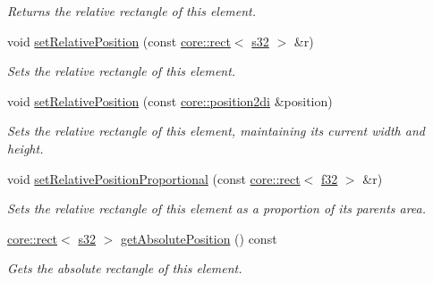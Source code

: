 \begin{DoxyCompactItemize}
\begin{DoxyCompactList}\small\item\em Returns the relative rectangle of this element. \end{DoxyCompactList}\item 
void \hyperlink{classirr_1_1gui_1_1IGUIElement_a0e5bb2d0a2e88e30d3697652f8dd7034}{set\+Relative\+Position} (const \hyperlink{classirr_1_1core_1_1rect}{core\+::rect}$<$ \hyperlink{namespaceirr_ac66849b7a6ed16e30ebede579f9b47c6}{s32} $>$ \&r)
\begin{DoxyCompactList}\small\item\em Sets the relative rectangle of this element. \end{DoxyCompactList}\item 
void \hyperlink{classirr_1_1gui_1_1IGUIElement_aba1cfc75daa28e53a021faa2d954b79b}{set\+Relative\+Position} (const \hyperlink{namespaceirr_1_1core_ace0f1379db5f9f5660456ec57ab78202}{core\+::position2di} \&position)
\begin{DoxyCompactList}\small\item\em Sets the relative rectangle of this element, maintaining its current width and height. \end{DoxyCompactList}\item 
void \hyperlink{classirr_1_1gui_1_1IGUIElement_aa67e02ab54db1068e7c057721d2f24a5}{set\+Relative\+Position\+Proportional} (const \hyperlink{classirr_1_1core_1_1rect}{core\+::rect}$<$ \hyperlink{namespaceirr_a0277be98d67dc26ff93b1a6a1d086b07}{f32} $>$ \&r)
\begin{DoxyCompactList}\small\item\em Sets the relative rectangle of this element as a proportion of its parent\textquotesingle{}s area. \end{DoxyCompactList}\item 
\mbox{\label{classirr_1_1gui_1_1IGUIElement_a6c5b94dd889533a306a03e25d0998bdf}} 
\hyperlink{classirr_1_1core_1_1rect}{core\+::rect}$<$ \hyperlink{namespaceirr_ac66849b7a6ed16e30ebede579f9b47c6}{s32} $>$ \hyperlink{classirr_1_1gui_1_1IGUIElement_a6c5b94dd889533a306a03e25d0998bdf}{get\+Absolute\+Position} () const
\begin{DoxyCompactList}\small\item\em Gets the absolute rectangle of this element. \end{DoxyCompactList}\item 
\mbox{\label{classirr_1_1gui_1_1IGUIElement_ad06166ccb3e9c86f17bd2a6cfc627eba}} 

\end{DoxyCompactItemize}
